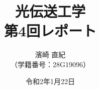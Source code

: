 \documentclass[a4paper]{jsarticle}
\title{\Huge 光伝送工学\\\huge 第4回レポート\vspace{120mm}}
\author{\Large 濱崎 直紀\\\large （学籍番号：28G19096）\vspace{25mm}}
\date{令和2年1月22日}
\begin{document}
\begin{titlepage}
\maketitle
\thispagestyle{empty}
\end{titlepage}


\end{document}
